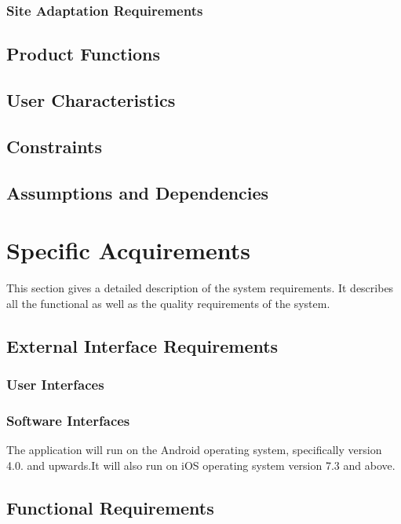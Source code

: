 \documentclass[a4paper,10pt]{article}
\begin{document}
		\subsubsection{Site Adaptation Requirements}
		
	\subsection{Product Functions}			
					
	\subsection{User Characteristics}

	\subsection{Constraints}

	\subsection{Assumptions and Dependencies}

		
	\section{Specific Acquirements}
This section gives a detailed description of the system requirements. It describes all the functional as well as the quality requirements of the system.

	\subsection{External Interface Requirements}

                 \subsubsection{User Interfaces}

                 \subsubsection{Software Interfaces}
The application will run on the Android operating system, specifically version 4.0. and upwards.It will also run on iOS operating system version 7.3 and above.

	\subsection{Functional Requirements}
\end{document}
